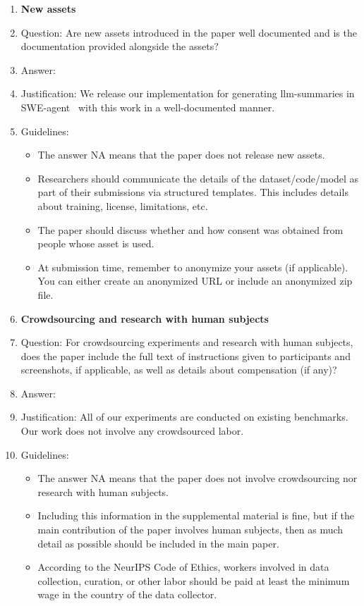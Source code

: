 \documentclass{article}
\begin{document}
\begin{enumerate}
\item {\bf New assets}
    \item[] Question: Are new assets introduced in the paper well documented and is the documentation provided alongside the assets?
    \item[] Answer: \answerYes{} %
    \item[] Justification: We release our implementation for generating \ac{llm}-summaries in SWE-agent~\cite{yang_swe-agent_2024} with this work in a well-documented manner.
    \item[] Guidelines:
    \begin{itemize}
        \item The answer NA means that the paper does not release new assets.
        \item Researchers should communicate the details of the dataset/code/model as part of their submissions via structured templates. This includes details about training, license, limitations, etc. 
        \item The paper should discuss whether and how consent was obtained from people whose asset is used.
        \item At submission time, remember to anonymize your assets (if applicable). You can either create an anonymized URL or include an anonymized zip file.
    \end{itemize}

\item {\bf Crowdsourcing and research with human subjects}
    \item[] Question: For crowdsourcing experiments and research with human subjects, does the paper include the full text of instructions given to participants and screenshots, if applicable, as well as details about compensation (if any)? 
    \item[] Answer: \answerNA{} %
    \item[] Justification: All of our experiments are conducted on existing benchmarks. Our work does not involve any crowdsourced labor.
    \item[] Guidelines:
    \begin{itemize}
        \item The answer NA means that the paper does not involve crowdsourcing nor research with human subjects.
        \item Including this information in the supplemental material is fine, but if the main contribution of the paper involves human subjects, then as much detail as possible should be included in the main paper. 
        \item According to the NeurIPS Code of Ethics, workers involved in data collection, curation, or other labor should be paid at least the minimum wage in the country of the data collector. 
    \end{itemize}


\end{enumerate}
\end{document}
